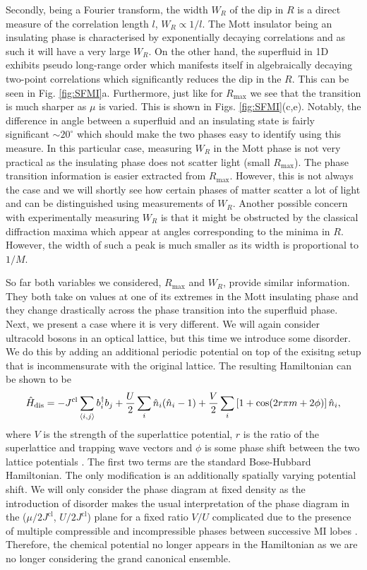 Secondly, being a Fourier transform, the width $W_R$ of the dip in $R$
is a direct measure of the correlation length $l$, $W_R \propto
1/l$. The Mott insulator being an insulating phase is characterised by
exponentially decaying correlations and as such it will have a very
large $W_R$. On the other hand, the superfluid in 1D exhibits pseudo
long-range order which manifests itself in algebraically decaying
two-point correlations \cite{giamarchi} which significantly reduces
the dip in the $R$. This can be seen in
Fig. \ref{fig:SFMI}a. Furthermore, just like for $R_\text{max}$ we see
that the transition is much sharper as $\mu$ is varied. This is shown
in Figs. \ref{fig:SFMI}(c,e). Notably, the difference in angle between
a superfluid and an insulating state is fairly significant $\sim
20^\circ$ which should make the two phases easy to identify using this
measure. In this particular case, measuring $W_R$ in the Mott phase is
not very practical as the insulating phase does not scatter light
(small $R_\mathrm{max}$). The phase transition information is easier
extracted from $R_\mathrm{max}$. However, this is not always the case
and we will shortly see how certain phases of matter scatter a lot of
light and can be distinguished using measurements of $W_R$. Another
possible concern with experimentally measuring $W_R$ is that it might
be obstructed by the classical diffraction maxima which appear at
angles corresponding to the minima in $R$. However, the width of such
a peak is much smaller as its width is proportional to $1/M$.

So far both variables we considered, $R_\text{max}$ and $W_R$, provide
similar information. They both take on values at one of its extremes
in the Mott insulating phase and they change drastically across the
phase transition into the superfluid phase. Next, we present a case
where it is very different. We will again consider ultracold bosons in
an optical lattice, but this time we introduce some disorder. We do
this by adding an additional periodic potential on top of the exisitng
setup that is incommensurate with the original lattice. The resulting
Hamiltonian can be shown to be
\begin{equation}
  \hat{H}_\mathrm{dis} = -J^\mathrm{cl} \sum_{\langle i, j \rangle}
  b^\dagger_i b_j + \frac{U}{2} \sum_i \hat{n}_i (\hat{n}_i - 1) +
  \frac{V}{2} \sum_i \left[ 1 + \cos (2 r \pi m + 2 \phi) \right]
  \hat{n}_i,
\end{equation}
where $V$ is the strength of the superlattice potential, $r$ is the
ratio of the superlattice and trapping wave vectors and $\phi$ is some
phase shift between the two lattice potentials \cite{roux2008}. The
first two terms are the standard Bose-Hubbard Hamiltonian. The only
modification is an additionally spatially varying potential shift. We
will only consider the phase diagram at fixed density as the
introduction of disorder makes the usual interpretation of the phase
diagram in the ($\mu/2J^\text{cl}$, $U/2J^\text{cl}$) plane for a
fixed ratio $V/U$ complicated due to the presence of multiple
compressible and incompressible phases between successive MI lobes
\cite{roux2008}. Therefore, the chemical potential no longer appears
in the Hamiltonian as we are no longer considering the grand canonical
ensemble.

